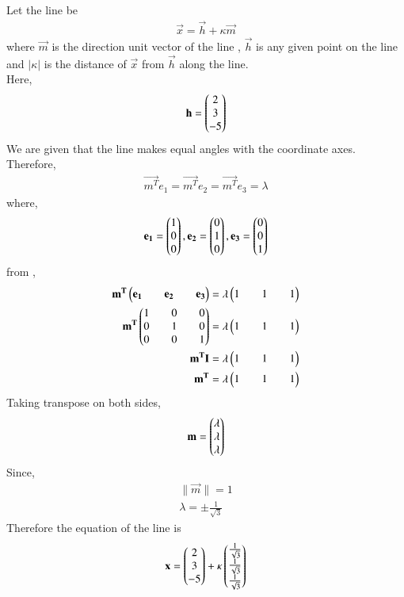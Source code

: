\documentclass[journal]{IEEEtran}
\begin{document}
Let the line be
\begin{align}
    \vec{x} = \vec{h} + \kappa\vec{m}
\end{align}
where $\vec{m}$ is the direction unit vector of the line ,  $\vec{h}$ is any given point on the line and $\lvert \kappa \rvert$ is the distance of $\vec{x}$ from $\vec{h}$ along the line.\\
Here,
\begin{align}
    \mathbf{h} = \begin{pmatrix}2 \\ 3 \\ -5\end{pmatrix}
\end{align}
We are given that the line makes equal angles with the coordinate axes. Therefore,\\
\begin{align}
    \vec{m^T}e_1 = \vec{m^T}e_2 = \vec{m^T}e_3 = \lambda
\end{align}
where,
\begin{align}
    \mathbf{e_1} = \begin{pmatrix}1 \\ 0 \\ 0\end{pmatrix},
    \mathbf{e_2} = \begin{pmatrix}0 \\ 1 \\ 0\end{pmatrix},
    \mathbf{e_3} = \begin{pmatrix}0 \\ 0 \\ 1\end{pmatrix}
\end{align}
from ,
\begin{align}
    \mathbf{m^T}\begin{pmatrix}\mathbf{e_1} && \mathbf{e_2} && \mathbf{e_3}\end{pmatrix} = \lambda\begin{pmatrix}1 && 1 && 1\end{pmatrix}\\
    \mathbf{m^T}\begin{pmatrix}1 && 0 && 0 \\ 0 && 1 && 0 \\ 0 && 0 && 1\end{pmatrix} = \lambda\begin{pmatrix}1 && 1 && 1\end{pmatrix}\\
    \mathbf{m^T}\mathbf{I} = \lambda\begin{pmatrix}1 && 1 && 1\end{pmatrix}\\
    \mathbf{m^T} = \lambda\begin{pmatrix}1 && 1 && 1\end{pmatrix}
\end{align}
Taking transpose on both sides,
\begin{align}
    \mathbf{m} = \begin{pmatrix}\lambda \\ \lambda \\ \lambda\end{pmatrix}
\end{align}
Since,
\begin{align}
    \big\lVert \vec{m} \big\rVert = 1\\
    \lambda = \pm\frac{1}{\sqrt{3}}
\end{align}
Therefore the equation of the line is
\begin{align}
    \mathbf{x} = \begin{pmatrix}2 \\ 3 \\ -5\end{pmatrix} + \kappa\begin{pmatrix}\frac{1}{\sqrt{3}} \\ \frac{1}{\sqrt{3}} \\ \frac{1}{\sqrt{3}}\end{pmatrix} 
\end{align}
\end{document}

